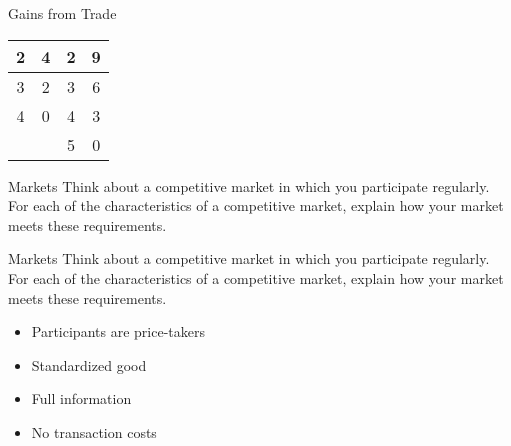 \documentclass{beamer}
\begin{document}
\begin{frame}[t]{Gains from Trade}
\begin{table}[]
\begin{tabular}{|c|c|c|c|}
    2                                                         & 4                                                             & 2                                                         & 9                                                             \\ \hline
    3                                                         & 2                                                             & 3                                                         & 6                                                             \\ \hline
    4                                                         & 0                                                             & 4                                                         & 3                                                             \\ \hline
                                                              &                                                               & 5                                                         & 0                                                             \\ \hline
    \end{tabular}
    \end{table}
\end{frame}

\begin{frame}[t]{Markets}
    Think about a competitive market in which you participate regularly. For each of the characteristics of a competitive market, explain how your market meets these requirements.
\end{frame}

\begin{frame}[t]{Markets}
    Think about a competitive market in which you participate regularly. For each of the characteristics of a competitive market, explain how your market meets these requirements.
    \begin{itemize}
        \item Participants are price-takers
        \item Standardized good
        \item Full information
        \item No transaction costs
    \end{itemize}
\end{frame}
\end{document}
